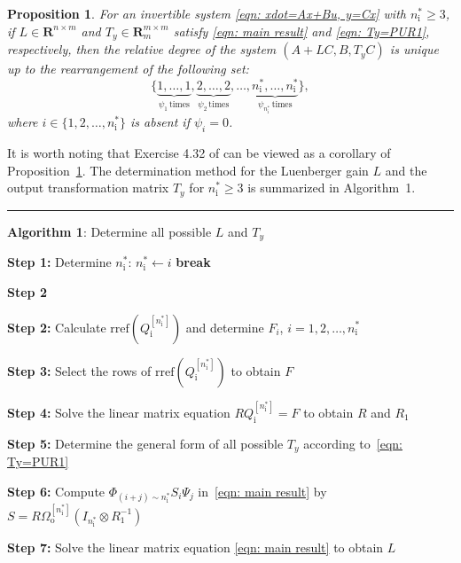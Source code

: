 \documentclass[sort&compress]{elsarticle}
\newtheorem{prop}{Proposition}
\newcommand\faii{\varphi_\mathrm i}
\newcommand\nsharp{n_\mathrm i^*}
\newcommand\Pio{\mathit\Omega_\mathrm o}
\newcommand\Qi{Q_\mathrm i}
\newcommand\rref{\mathrm{rref}}
\newcommand\R{\mathbf R}
\newcommand\PHi{\mathit\Phi}
\newcommand\PSi{\mathit\Psi}
\begin{document}
\begin{prop}\label{thm: relative degree of (A+LC,B,TyC)}
For an invertible system \eqref{eqn: xdot=Ax+Bu, y=Cx} with $\nsharp\ge 3$,
if $L \in \R^{n \times m}$ and $T_y \in \R^{m \times m}_m$
satisfy \eqref{eqn: main result} and \eqref{eqn: Ty=PUR1}, respectively,
then the relative degree of the system $(A+LC, B, T_yC)$ is unique
up to the rearrangement of the following set:
\begin{equation}\label{eqn: relative degree psi1...psinsharp}
\{\underbrace{1,\dots,1}_{\psi_1\,\mathrm{times}},
\underbrace{2,\dots,2}_{\psi_2\,\mathrm{times}},\dots,
\underbrace{\nsharp,\dots,\nsharp}_{\psi_{\nsharp}\,\mathrm{times}}\},
\end{equation}
where $i \in \{1,2,\dots,\nsharp\}$ is absent if $\psi_i=0$.
\end{prop}

It is worth noting that Exercise 4.32 of \cite{Zhoubook}
can be viewed as a corollary of Proposition~\ref{thm: relative degree of (A+LC,B,TyC)}.
The determination method for the Luenberger gain $L$ and
the output transformation matrix $T_y$ for $\nsharp \ge 3$
is summarized in Algorithm~1.

\noindent\rule{\linewidth}{1pt}
\noindent\textbf{Algorithm 1}: Determine all possible $L$ and $T_y$

\begin{algorithmic}

\State \textbf{Step 1:} Determine $\nsharp$:
  \If{$\faii^{[i]}=m$}
    \State $\nsharp \gets i$
    \State \textbf{break}
  \EndIf
\EndFor

\If{$\nsharp=1$ or $2$}
  \State \Return {}
\Else
  \State \textbf{Step 2} 
\EndIf

\State \textbf{Step 2:} Calculate $\rref(\Qi^{[\nsharp]})$ and determine
$F_i$, $i=1,2,\dots,\nsharp$

\State \textbf{Step 3:} Select the rows of $\rref(\Qi^{[\nsharp]})$ to obtain $F$

\State \textbf{Step 4:} Solve the linear matrix equation
$R\Qi^{[\nsharp]}=F$ to obtain $R$ and $R_1$

\State \textbf{Step 5:} Determine the general form of all possible $T_y$
according to~\eqref{eqn: Ty=PUR1}

\State \textbf{Step 6:} Compute
$\PHi_{(i+j)\sim \nsharp} S_i \PSi_j$
in~\eqref{eqn: main result} by
$S = R\Pio^{[\nsharp]}(I_{\nsharp}\otimes R_1^{-1})$

\State \textbf{Step 7:} Solve the linear matrix equation
\eqref{eqn: main result} to obtain $L$

\end{algorithmic}
\end{document}
